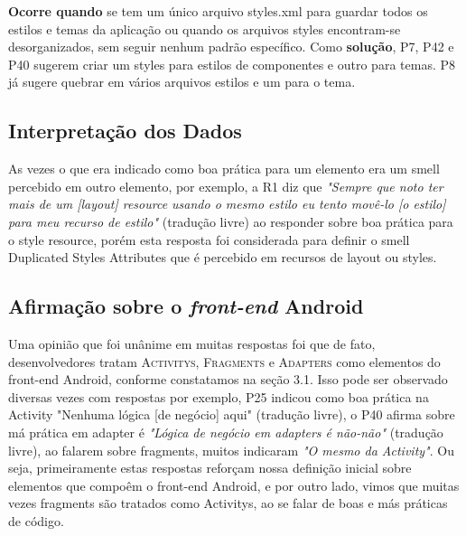 \textbf{Ocorre quando} se tem um \'unico arquivo styles.xml para guardar todos os estilos e temas da aplica\c{c}\~ao ou quando os arquivos styles encontram-se desorganizados, sem seguir nenhum padr\~ao espec\'ifico. Como \textbf{solu\c{c}\~ao}, P7, P42 e P40 sugerem criar um styles para estilos de componentes e outro para temas. P8 j\'a sugere quebrar em v\'arios arquivos estilos e um para o tema.



\subsection{Interpreta\c{c}\~ao dos Dados}

As vezes o que era indicado como boa pr\'atica para um elemento era um smell percebido em outro elemento, por exemplo, a R1 diz que \textit{"Sempre que noto ter mais de um [layout] resource usando o mesmo estilo eu tento mov\^e-lo [o estilo] para meu recurso de estilo"} (tradu\c{c}\~ao livre) ao responder sobre boa pr\'atica para o style resource, por\'em esta resposta foi considerada para definir o smell Duplicated Styles Attributes que \'e percebido em recursos de layout ou styles.


\subsection{Afirma\c{c}\~ao sobre o \textit{front-end} Android}

Uma opini\~ao que foi un\^anime em muitas respostas foi que de fato, desenvolvedores tratam \textsc{Activitys}, \textsc{Fragments} e \textsc{Adapters} como elementos do front-end Android, conforme constatamos na se\c{c}\~ao 3.1. Isso pode ser observado diversas vezes com respostas por exemplo, P25 indicou como boa pr\'atica na Activity "Nenhuma l\'ogica [de neg\'ocio] aqui" (tradu\c{c}\~ao livre), o P40 afirma sobre m\'a pr\'atica em adapter \'e \textit{"L\'ogica de neg\'ocio em adapters \'e n\~ao-n\~ao"} (tradu\c{c}\~ao livre), ao falarem sobre fragments, muitos indicaram \textit{"O mesmo da Activity"}. Ou seja, primeiramente estas respostas refor\c{c}am nossa defini\c{c}\~ao inicial sobre elementos que compo\^em o front-end Android, e por outro lado, vimos que muitas vezes fragments s\~ao tratados como Activitys, ao se falar de boas e m\'as pr\'aticas de c\'odigo.

